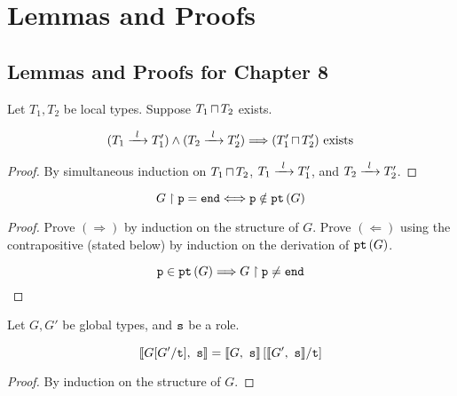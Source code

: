 \chapter{Lemmas and Proofs}

\section{Lemmas and Proofs for Chapter 8}
\label{section:proofs}

\begin{lemma}
Let $T_1, T_2$ be local types.
Suppose ${T_1}\,{\sqcap}\,{T_2}$ exists.

\[
(\treduce{T_1}{T'_1}{l}) \wedge (\treduce{T_2}{T'_2}{l})
	\Longrightarrow
(\tmerge{T'_1}{T'_2}) \text{ exists}
\]

\label{lem:localltspreservemerge}
\end{lemma}

\begin{proof}
By simultaneous induction on
${T_1}\,{\sqcap}\,{T_2}$, $\treduce{T_1}{T'_1}{l}$,
and $\treduce{T_2}{T'_2}{l}$.

\end{proof}

\begin{lemma}

\[
{G} \upharpoonright {\mathtt{p}} = \textnormal{\texttt{end}} \Longleftrightarrow {\mathtt{p}} \notin {\textnormal{\texttt{pt}}\left({G}\right)}
\]

\label{lem:projpt}
\end{lemma}

\begin{proof} 
Prove $(\Longrightarrow)$ by induction on the structure of $G$.
Prove $(\Longleftarrow)$ using the contrapositive (stated below)
by induction on the derivation of ${\textnormal{\texttt{pt}}\left({G}\right)}$.

\[
{\mathtt{p}} \in {\textnormal{\texttt{pt}}\left({G}\right)} \Longrightarrow {G} \upharpoonright {\mathtt{p}} \neq \textnormal{\texttt{end}}
\]
\end{proof}

\begin{lemma}
Let $G, G'$ be global types, and ${\mathtt{s}}$ be a role.

\[
\llbracket {G[G' / \textnormal{\texttt{t}}]},~{\mathtt{s}} \rrbracket = \llbracket {G},~{\mathtt{s}} \rrbracket\left[ \llbracket {G'},~{\mathtt{s}} \rrbracket / \textnormal{\texttt{t}} \right]
\]

\label{lem:encsub}
\end{lemma}

\begin{proof}
By induction on the structure of $G$.
\end{proof}

